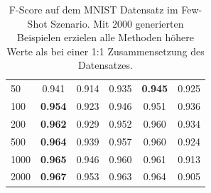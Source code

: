 \begin{table}[hbt]
{\begin{tabular}{l|c|c|c|c|c}
50                                                                & 0.941          & 0.914          & 0.935                                                           & \textbf{0.945}                                                  & 0.925     \\
100                                                               & \textbf{0.954} & 0.923          & 0.946                                                           & 0.951                                                           & 0.936     \\
200                                                               & \textbf{0.962} & 0.929          & 0.952                                                           & 0.960                                                           & 0.934     \\
500                                                               & \textbf{0.964} & 0.939          & 0.957                                                           & 0.960                                                           & 0.924     \\
1000                                                              & \textbf{0.965} & 0.946          & 0.960                                                           & 0.961                                                           & 0.913     \\
2000                                                              & \textbf{0.967} & 0.953          & 0.963                                                           & 0.964                                                           & 0.905     \\
\bottomrule
\end{tabular}}
\caption{F-Score auf dem MNIST Datensatz im Few-Shot Szenario. Mit 2000 generierten Beispielen erzielen alle Methoden höhere Werte als bei einer 1:1 Zusammensetzung des Datensatzes.}
\label{tab:mnist_2000_gen}
\end{table}


